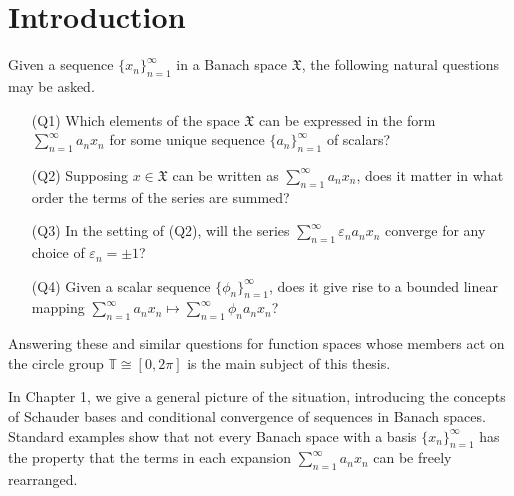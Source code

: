 \documentclass[honours,12pt]{unswthesis}
\newcommand{\T}{\mathbb{T}}
\newcommand{\X}{\mathfrak{X}}
\newcommand\blankpage{%
    \null
    \thispagestyle{empty}%
    \addtocounter{page}{-1}%
    \newpage}
\numberwithin{equation}{section}
\begin{document}
\afterpage{\blankpage}


\afterpreface

%
%

\afterpage{\blankpage}

\chapter{Introduction}\label{s-intro}


{\noindent}Given a sequence $\{x_n\}_{n=1}^{\infty}$ in a Banach space $\X$,
the following natural questions may be asked.
\begin{enumerate}
\item[(Q1)] Which elements of the space $\X$ can be expressed in the form
$\sum_{n=1}^{\infty}a_nx_n$ for some unique sequence $\{a_n\}_{n=1}^{\infty}$
of scalars?

\item[(Q2)] Supposing $x\in\X$ can be written as $\sum_{n=1}^{\infty}a_nx_n$,
does it matter in what order the terms of the series are summed?

\item[(Q3)] In the setting of (Q2), will the series
$\sum_{n=1}^{\infty}\varepsilon_na_nx_n$ converge for any choice of
$\varepsilon_n=\pm 1$?

\item[(Q4)] Given a scalar sequence $\{\phi_n\}_{n=1}^{\infty}$, does it give
rise to a bounded linear mapping
$\sum_{n=1}^{\infty}a_nx_n\mapsto\sum_{n=1}^{\infty}\phi_na_nx_n$?
\end{enumerate}

{\noindent}Answering these and similar questions for
function spaces whose members act on the circle group $\T\cong[0,2\pi]$
is the main subject of this thesis.

In Chapter 1, we give a general picture of the situation, introducing the
concepts of Schauder bases and conditional convergence of sequences in Banach
spaces. Standard examples show that not every Banach space with a basis
$\{x_n\}_{n=1}^{\infty}$ has the property that the terms in each expansion 
$\sum_{n=1}^{\infty}a_nx_n$ can be freely rearranged.
\end{document}
